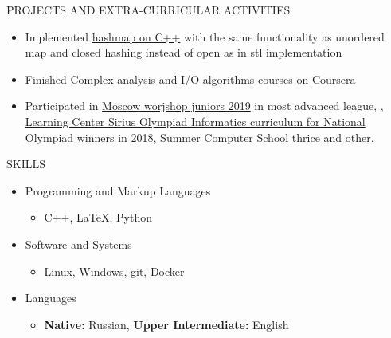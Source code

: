 \documentclass{resume} %
\newcommand{\resitem}[1]{\item #1 \vspace{-2pt}}
\begin{document}
\begin{rSection}{PROJECTS AND EXTRA-CURRICULAR ACTIVITIES}
\begin{itemize}

\item {Implemented \href{https://github.com/Oanikulin/HashMap}{hashmap on C++} with the same functionality as unordered map and closed hashing instead of open as in stl implementation}
\item {Finished \href{https://coursera.org/share/4015703bf16f605537f5b29a1746dfe9}{ 
    Complex analysis} and \href{https://coursera.org/share/5378026a81ad6bbf81ffaed2c7062583}{I/O algorithms} courses on Coursera}
\item  {Participated in \href{https://it-edu.com/ru/%D1%88%D0%BA%D0%BE%D0%BB%D1%8C%D0%BD%D0%B8%D0%BA%D0%B0%D0%BC/%D0%B7%D0%B8%D0%BC%D0%BD%D1%8F%D1%8F-%D0%BA%D0%BE%D0%BC%D0%BF%D1%8C%D1%8E%D1%82%D0%B5%D1%80%D0%BD%D0%B0%D1%8F-%D1%88%D0%BA%D0%BE%D0%BB%D0%B0/zksh2019}{Moscow worjshop juniors 2019} in most advanced league, , \href{https://sochisirius.ru/obuchenie/nauka/smena170/752}{Learning Center Sirius Olympiad Informatics curriculum for National Olympiad winners in 2018}, \href{https://lksh.ru/}{Summer Computer School} thrice and other}.
\end{itemize}
\end{rSection} 
 
\begin{rSection}{SKILLS}

\begin{itemize}
\item
	Programming and Markup Languages
	\begin{itemize}
		\resitem {C++, \LaTeX, Python}
	\end{itemize}

\item
	Software and Systems
	\begin{itemize}
		\resitem{Linux, Windows, git, Docker}
	\end{itemize}

\item
	Languages
	\begin{itemize}
		\resitem{{\bf Native:} Russian, {\bf Upper Intermediate:} English}
	\end{itemize}
\end{itemize}
\end{rSection}
\end{document}
